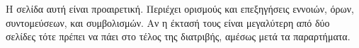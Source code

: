 \chapter*{\glossaryname}
\addstarredchapter{\glossaryname} %

Η σελίδα αυτή είναι προαιρετική.
Περιέχει ορισμούς και επεξηγήσεις εννοιών, όρων, συντομεύσεων, και συμβολισμών.
Αν η έκτασή τους είναι μεγαλύτερη από δύο σελίδες τότε πρέπει να πάει στο τέλος της διατριβής, αμέσως μετά τα παραρτήματα.